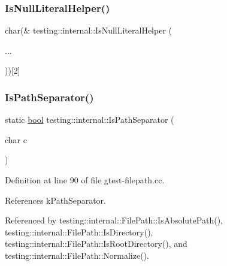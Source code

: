 \mbox{\label{namespacetesting_1_1internal_ab53ecfa1632a871ce7c692d722a75a57}} 
\subsubsection{\texorpdfstring{Is\+Null\+Literal\+Helper()}{IsNullLiteralHelper()}\hspace{0.1cm}{\footnotesize\ttfamily [2/2]}}
{\footnotesize\ttfamily char(\& testing\+::internal\+::\+Is\+Null\+Literal\+Helper (\begin{DoxyParamCaption}\item[{}]{... }\end{DoxyParamCaption}))\mbox{[}2\mbox{]}}

\mbox{\label{namespacetesting_1_1internal_a6b8d22cee9edbbfe56077420a6fa1cb1}} 
\subsubsection{\texorpdfstring{Is\+Path\+Separator()}{IsPathSeparator()}}
{\footnotesize\ttfamily static \hyperlink{classbool}{bool} testing\+::internal\+::\+Is\+Path\+Separator (\begin{DoxyParamCaption}\item[{char}]{c }\end{DoxyParamCaption})\hspace{0.3cm}{\ttfamily [static]}}



Definition at line 90 of file gtest-\/filepath.\+cc.



References k\+Path\+Separator.



Referenced by testing\+::internal\+::\+File\+Path\+::\+Is\+Absolute\+Path(), testing\+::internal\+::\+File\+Path\+::\+Is\+Directory(), testing\+::internal\+::\+File\+Path\+::\+Is\+Root\+Directory(), and testing\+::internal\+::\+File\+Path\+::\+Normalize().


